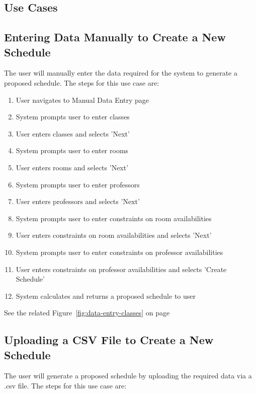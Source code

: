 \documentclass{extarticle}
\begin{document}
\newpage

\begin{appendices}
\section{Use Cases}

\subsection{Entering Data Manually to Create a New Schedule}
The user will manually enter the data required for the system to generate a proposed schedule.  The steps for this
use case are:

\begin{enumerate}
    \item User navigates to Manual Data Entry page
    \item System prompts user to enter classes
    \item User enters classes and selects 'Next'
    \item System prompts user to enter rooms
    \item User enters rooms and selects 'Next'
    \item System prompts user to enter professors
    \item User enters professors and selects 'Next'
    \item System prompts user to enter constraints on room availabilities
    \item User enters constraints on room availabilities and selects 'Next'
    \item System prompts user to enter constraints on professor availabilities
    \item User enters constraints on professor availabilities and selects 'Create Schedule'
    \item System calculates and returns a proposed schedule to user
\end{enumerate}

See the related Figure~\ref{fig:data-entry-classes} on page~\pageref{fig:data-entry-classes}

\subsection{Uploading a CSV File to Create a New Schedule}
The user will generate a proposed schedule by uploading the required data via a .csv file.  The steps for this use
case are:


\end{appendices}
\end{document}
